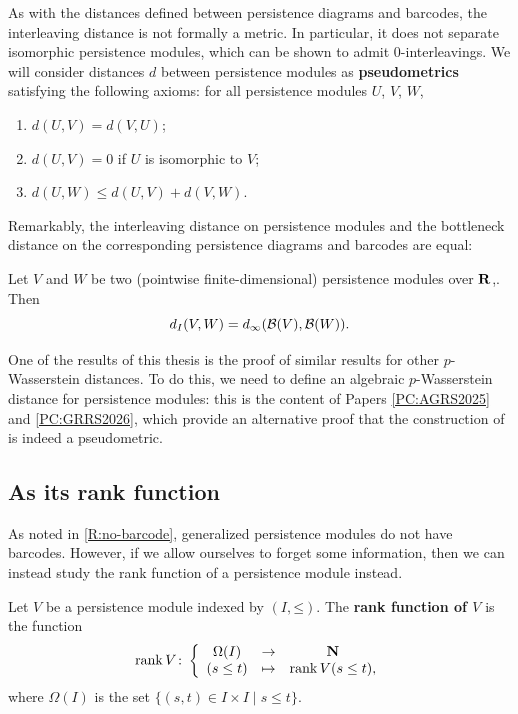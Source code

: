 \begin{remark}
  As with the distances defined between persistence diagrams and barcodes, the interleaving distance is not formally a metric. In particular, it does not separate isomorphic persistence modules, which can be shown to admit $0$-interleavings. We will consider distances $d$ between persistence modules as \textbf{pseudometrics} satisfying the following axioms: for all persistence modules $U$, $V$, $W$,
  \begin{enumerate}
    \item $d(U, V) = d(V, U)$;
    \item $d(U, V) = 0$ if $U$ is isomorphic to $V$;
    \item $d(U, W) \leq d(U, V) + d(V, W)$. \qedhere
  \end{enumerate}
\end{remark}

Remarkably, the interleaving distance on persistence modules and the bottleneck distance on the corresponding persistence diagrams and barcodes are equal:

\begin{theorem}
\label{T:isometry-infty}
  Let $V$ and $W$ be two (pointwise finite-dimensional) persistence modules over $\mathbf{R}$,. Then
  \[
    d_I(V, W) = d_\infty(\mathcal{B}(V), \mathcal{B}(W)).
  \]
\end{theorem}

One of the results of this thesis is the proof of similar results for other $p$-Wasserstein distances. To do this, we need to define an algebraic $p$-Wasserstein distance for persistence modules: this is the content of Papers \ref{PC:AGRS2025} and \ref{PC:GRRS2026}, which provide an alternative proof that the construction of \cite{SkrabaTurner2023} is indeed a pseudometric.

\subsection{As its rank function}
\label{SS:rank-function}

As noted in \cref{R:no-barcode}, generalized persistence modules do not have barcodes. However, if we allow ourselves to forget some information, then we can instead study the rank function of a persistence module instead.

\begin{definition}
\label{!D:rank-function}
  Let $V$ be a persistence module indexed by $(I, \mathord{\leq})$. The \textbf{rank function of $V$} is the function
  \[
    \operatorname{rank} V \colon \left\{ \begin{array}{ccc}
      \Omega(I) & \to & \mathbf{N} \\
      (s \leq t) & \mapsto & \operatorname{rank} V(s \leq t),
    \end{array} \right.
  \]
  where $\Omega(I)$ is the set $\{(s, t) \in I \times I \mid s \leq t\}$.
\end{definition}


